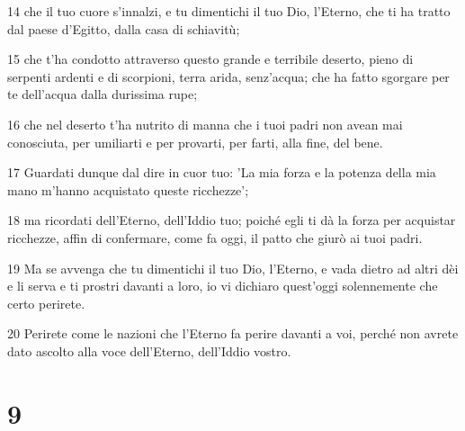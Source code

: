 \par 14 che il tuo cuore s'innalzi, e tu dimentichi il tuo Dio, l'Eterno, che ti ha tratto dal paese d'Egitto, dalla casa di schiavitù;
\par 15 che t'ha condotto attraverso questo grande e terribile deserto, pieno di serpenti ardenti e di scorpioni, terra arida, senz'acqua; che ha fatto sgorgare per te dell'acqua dalla durissima rupe;
\par 16 che nel deserto t'ha nutrito di manna che i tuoi padri non avean mai conosciuta, per umiliarti e per provarti, per farti, alla fine, del bene.
\par 17 Guardati dunque dal dire in cuor tuo: 'La mia forza e la potenza della mia mano m'hanno acquistato queste ricchezze';
\par 18 ma ricordati dell'Eterno, dell'Iddio tuo; poiché egli ti dà la forza per acquistar ricchezze, affin di confermare, come fa oggi, il patto che giurò ai tuoi padri.
\par 19 Ma se avvenga che tu dimentichi il tuo Dio, l'Eterno, e vada dietro ad altri dèi e li serva e ti prostri davanti a loro, io vi dichiaro quest'oggi solennemente che certo perirete.
\par 20 Perirete come le nazioni che l'Eterno fa perire davanti a voi, perché non avrete dato ascolto alla voce dell'Eterno, dell'Iddio vostro.

\chapter{9}

